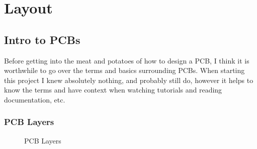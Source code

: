 \chapter{Layout
\label{Layout}}
\section{Intro to PCBs}
Before getting into the meat and potatoes of how to design a PCB, I think it is worthwhile to go over the terms and basics surrounding PCBs.
When starting this project I knew absolutely nothing, and probably still do, however it helps to know the terms and have context when
watching tutorials and reading documentation, etc.

\subsection{PCB Layers}

\begin{figure}[H]
  \centering
\caption{PCB Layers}
\label{img:pcblayers}
\end{figure}

